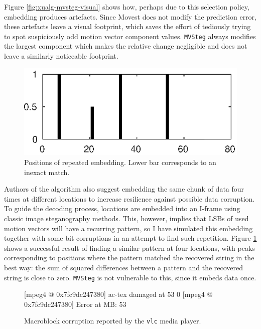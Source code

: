 \documentclass[12pt,british,twoside,notitlepage,usenames,dvipsnames,hypens,final]{report}
\numberwithin{equation}{section}
\numberwithin{figure}{section}
\renewenvironment{alltt}{\vspace{-0.6\baselineskip}\begin{oldalltt}}{\end{oldalltt}\vspace{-0.1\baselineskip}}
\begin{document}
Figure \ref{fig:xualg-mvsteg-visual} shows how, perhaps due to this selection policy, embedding produces artefacts. Since Movest does not modify the prediction error, these artefacts leave a visual footprint, which saves the effort of tediously trying to spot suspiciously odd motion vector component values. \texttt{MVSteg} always modifies the largest component which makes the relative change negligible and does not leave a similarly noticeable footprint.

\begin{figure}
\centering
\includegraphics[scale=0.75]{img/4xembed.eps}
\caption{Positions of repeated embedding. Lower bar corresponds to an inexact match.}
\label{fig:4xembed}
\end{figure}

Authors of the algorithm also suggest embedding the same chunk of data four times at different locations to increase resilience against possible data corruption. To guide the decoding process, locations are embedded into an I-frame using classic image steganography methods. This, however, implies that LSBs of used motion vectors will have a recurring pattern, so I have simulated this embedding together with some bit corruptions in an attempt to find such repetition. Figure \ref{fig:4xembed} shows a successful result of finding a similar pattern at four locations, with peaks corresponding to positions where the pattern matched the recovered string in the best way: the sum of squared differences between a pattern and the recovered string is close to zero. \texttt{MVSteg} is not vulnerable to this, since it embeds data once.

\begin{figure}
\begingroup
    \fontsize{10pt}{12pt}\selectfont
\centering
\begin{alltt}
{\color{blue}[mpeg4 @ 0x7fc9dc247380]} {\color{red}ac-tex damaged at 53 0}
{\color{blue}[mpeg4 @ 0x7fc9dc247380]} {\color{red}Error at MB: 53}
\end{alltt}
\endgroup
\caption{Macroblock corruption reported by the \texttt{vlc} media player.}
\label{fig:vlc-corruption}
\end{figure}
\end{document}
